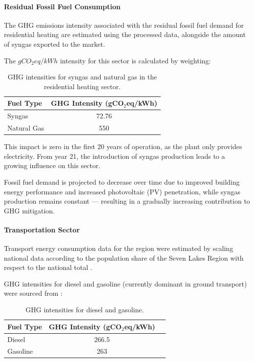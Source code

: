 \paragraph{Residual Fossil Fuel Consumption}
The GHG emissions intensity associated with the residual fossil fuel demand for residential heating are estimated using the processed data, alongside the amount of syngas exported to the market.

The $gCO_{2}eq/kWh$ intensity for this sector is calculated by weighting:
\begin{table}[H]
    \centering
    \begin{tabular}{lc}
        \toprule
        \textbf{Fuel Type} & \textbf{GHG Intensity (gCO$_2$eq/kWh)} \\
        \midrule
        Syngas      & 72.76 \\
        Natural Gas & 550 \\
        \bottomrule
    \end{tabular}
    \caption{GHG intensities for syngas and natural gas in the residential heating sector.}
    \label{tab:residential_heating_ghg}
\end{table}

This impact is zero in the first 20 years of operation, as the plant only provides electricity. From year 21, the introduction of syngas production leads to a growing influence on this sector.

Fossil fuel demand is projected to decrease over time due to improved building energy performance and increased photovoltaic (PV) penetration, while syngas production remains constant — resulting in a gradually increasing contribution to GHG mitigation.


\paragraph{Transportation Sector}
Transport energy consumption data for the region were estimated by scaling national data \cite{eurostat_sankey_2023} according to the population share of the Seven Lakes Region with respect to the national total \cite{istat2023}.

GHG intensities for diesel and gasoline (currently dominant in ground transport) were sourced from \cite{quaschning_co2spec_2025}:
\begin{table}[H]
    \centering
    \begin{tabular}{lcc}
        \toprule
        \textbf{Fuel Type} & \textbf{GHG Intensity (gCO$_2$eq/kWh)} \\
        \midrule
        Diesel    & 266.5 \\
        Gasoline  & 263 \\
        \bottomrule
    \end{tabular}
    \caption{GHG intensities for diesel and gasoline.}
    \label{tab:transportation_ghg}
\end{table}

